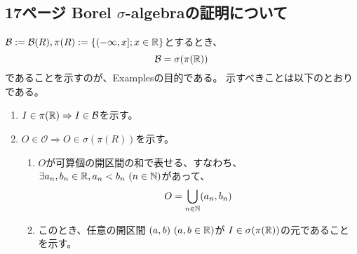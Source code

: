     \subsection{17ページ Borel $\sigma$-algebraの証明について}
        ${\mathcal{B}} := {\mathcal{B}}(R), \pi(R) :=\{(-\infty, x];x\in{\mathbb{R}}\}$とするとき、
        \[
            {\mathcal{B}} = \sigma(\pi({\mathbb{R}}))
        \]
        であることを示すのが、Examplesの目的である。
        示すべきことは以下のとおりである。
        \begin{enumerate}[font = \bfseries, label = step \arabic*.]
            \item $I\in\pi({\mathbb{R}})\Rightarrow I\in {\mathcal{B}}$を示す。
            \item $O\in\mathcal{O} \Rightarrow O \in \sigma(\pi(R))$を示す。
            \begin{enumerate}
                \item $O$が可算個の開区間の和で表せる、すなわち、
                    $\exists a_n, b_n\in\RR, a_n < b_n\ (n\in\NN)$があって、
                    \[
                        O = \bigcup_{n\in {\mathbb{N}}}(a_n, b_n)
                    \]
                \item このとき、任意の開区間
                    $(a, b)\ (a, b\in {\mathbb{R}})$が
                    $I\in\sigma(\pi({\mathbb{R}}))$の元であることを示す。
            \end{enumerate}
        \end{enumerate}
